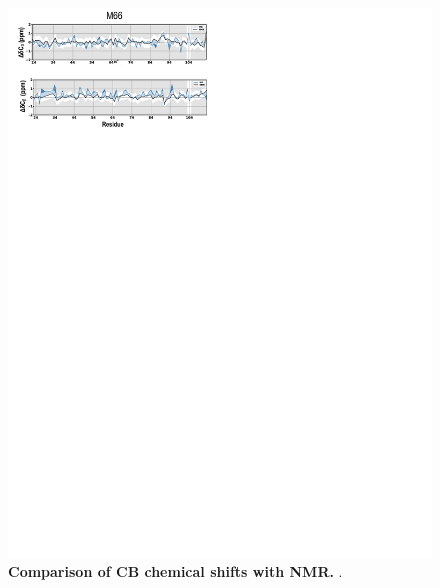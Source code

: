 \documentclass[journal=jacsat,manuscript=article]{achemso}
\begin{document}
\begin{figure}[!ht]
 \includegraphics[scale=0.5,width=\textwidth,trim={0 0cm 0 0},clip]{../figures/S2.pdf}
\caption{{\bf Comparison of CB chemical shifts with NMR.}
.
 }
\label{S2} 
\end{figure}
\end{document}
